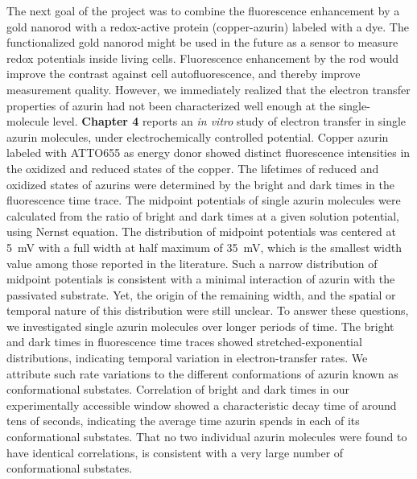 The next goal of the project was to combine the fluorescence enhancement by a gold nanorod with a redox-active protein (copper-azurin) labeled with a dye.
The functionalized gold nanorod might be used in the future as a sensor to measure redox potentials inside living cells.
Fluorescence enhancement by the rod would improve the contrast against cell autofluorescence, and thereby improve measurement quality.
However, we immediately realized that the electron transfer properties of azurin had not been characterized well enough at the single-molecule level.
\textbf{Chapter 4} reports an \textit{in vitro} study of electron transfer in single azurin molecules, under electrochemically controlled potential.
Copper azurin labeled with ATTO655 as energy donor showed distinct fluorescence intensities in the oxidized and reduced states of the copper.
The lifetimes of reduced and oxidized states of azurins were determined by the bright and dark times in the fluorescence time trace.
The midpoint potentials of single azurin molecules were calculated from the ratio of bright and dark times at a given solution potential, using Nernst equation.
The distribution of midpoint potentials was centered at \SI{5}{\mV} with a full width at half maximum of \SI{35}{\mV}, which is the smallest width value among those reported in the literature.
Such a narrow distribution of midpoint potentials is consistent with a minimal interaction of azurin with the passivated substrate.
Yet, the origin of the remaining width, and the spatial or temporal nature of this distribution were still unclear.
To answer these questions, we investigated single azurin molecules over longer periods of time.
The bright and dark times in fluorescence time traces showed stretched-exponential distributions, indicating temporal variation in electron-transfer rates.
We attribute such rate variations to the different conformations of azurin known as conformational substates.
Correlation of bright and dark times in our experimentally accessible window showed a characteristic decay time of around tens of seconds, indicating the average time azurin spends in each of its conformational substates.
That no two individual azurin molecules were found to have identical correlations, is consistent with a very large number of conformational substates.